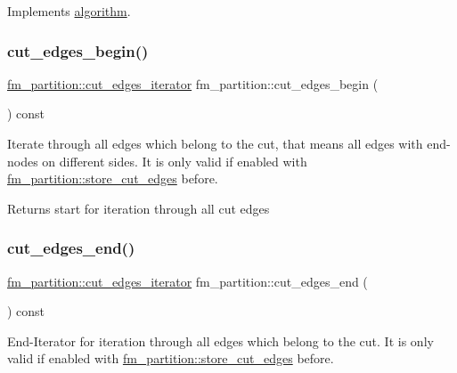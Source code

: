 Implements \mbox{\hyperlink{classalgorithm_a05c0f25463eb35a77b2d73fc06bb2c0e}{algorithm}}.

\mbox{\label{classfm__partition_a36990b62c6d2d9e4948f42d805afc626}} 
\subsubsection{\texorpdfstring{cut\+\_\+edges\+\_\+begin()}{cut\_edges\_begin()}}
{\footnotesize\ttfamily \mbox{\hyperlink{classfm__partition_aede10aea3dda6be8014ce60fca728efe}{fm\+\_\+partition\+::cut\+\_\+edges\+\_\+iterator}} fm\+\_\+partition\+::cut\+\_\+edges\+\_\+begin (\begin{DoxyParamCaption}{ }\end{DoxyParamCaption}) const}

Iterate through all edges which belong to the cut, that means all edges with end-\/nodes on different sides. It is only valid if enabled with \mbox{\hyperlink{classfm__partition_ad0870674a1fb8e1c882f6855e32aec09}{fm\+\_\+partition\+::store\+\_\+cut\+\_\+edges}} before.

\begin{DoxyReturn}{Returns}
start for iteration through all cut edges 
\end{DoxyReturn}
\mbox{\label{classfm__partition_af213672f08e03878183659fa8c2ed61e}} 
\subsubsection{\texorpdfstring{cut\+\_\+edges\+\_\+end()}{cut\_edges\_end()}}
{\footnotesize\ttfamily \mbox{\hyperlink{classfm__partition_aede10aea3dda6be8014ce60fca728efe}{fm\+\_\+partition\+::cut\+\_\+edges\+\_\+iterator}} fm\+\_\+partition\+::cut\+\_\+edges\+\_\+end (\begin{DoxyParamCaption}{ }\end{DoxyParamCaption}) const}

End-\/\+Iterator for iteration through all edges which belong to the cut. It is only valid if enabled with \mbox{\hyperlink{classfm__partition_ad0870674a1fb8e1c882f6855e32aec09}{fm\+\_\+partition\+::store\+\_\+cut\+\_\+edges}} before.

